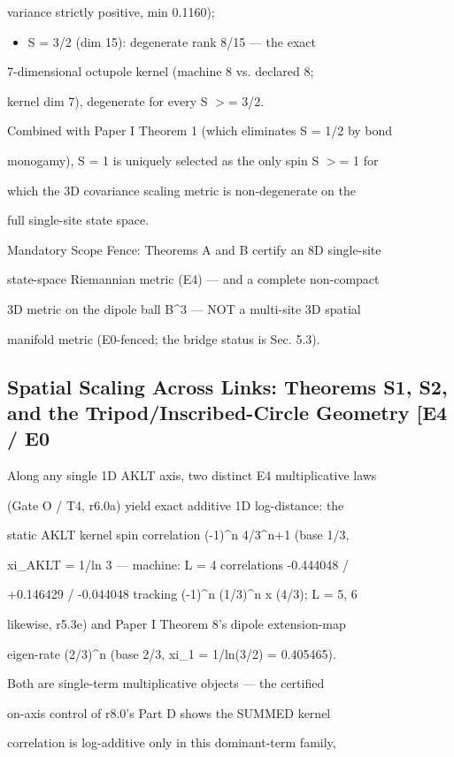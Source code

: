 \documentclass[11pt,a4paper]{article}
\theoremstyle{definition}
\begin{document}
    variance strictly positive, min 0.1160);

\begin{itemize}[leftmargin=1.4em]
\item S = 3/2 (dim 15): degenerate rank 8/15 — the exact
\end{itemize}
    7-dimensional octupole kernel (machine 8 vs. declared 8;

    kernel dim 7), degenerate for every S $>$= 3/2.


Combined with Paper I Theorem 1 (which eliminates S = 1/2 by bond

monogamy), S = 1 is uniquely selected as the only spin S $>$= 1 for

which the 3D covariance scaling metric is non-degenerate on the

full single-site state space.


Mandatory Scope Fence: Theorems A and B certify an 8D single-site

state-space Riemannian metric (E4) — and a complete non-compact

3D metric on the dipole ball B\^{}3 — NOT a multi-site 3D spatial

manifold metric (E0-fenced; the bridge status is Sec. 5.3).


\subsection{Spatial Scaling Across Links: Theorems S1, S2, and the Tripod/Inscribed-Circle Geometry [E4 / E0}

Along any single 1D AKLT axis, two distinct E4 multiplicative laws

(Gate O / T4, r6.0a) yield exact additive 1D log-distance: the

static AKLT kernel spin correlation (-1)\^{}n 4/3\^{}{n+1} (base 1/3,

xi\_AKLT = 1/ln 3 — machine: L = 4 correlations -0.444048 /

+0.146429 / -0.044048 tracking (-1)\^{}n (1/3)\^{}n x (4/3); L = 5, 6

likewise, r5.3e) and Paper I Theorem 8's dipole extension-map

eigen-rate (2/3)\^{}n (base 2/3, xi\_1 = 1/ln(3/2) = 0.405465).

Both are single-term multiplicative objects — the certified

on-axis control of r8.0's Part D shows the SUMMED kernel

correlation is log-additive only in this dominant-term family,
\end{document}
